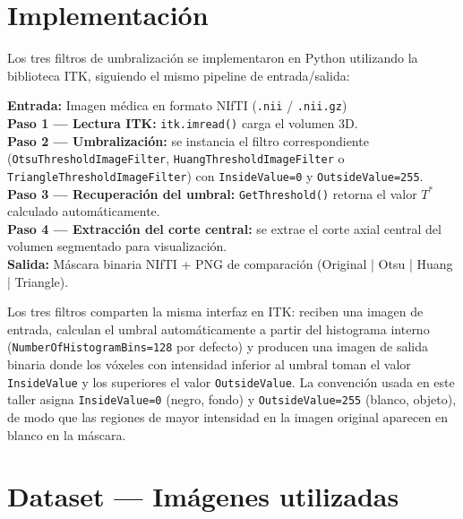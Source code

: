 \documentclass[12pt, a4paper]{article}
\begin{document}
\section{Implementación}

Los tres filtros de umbralización se implementaron en Python utilizando la biblioteca ITK,
siguiendo el mismo pipeline de entrada/salida:

\begin{tcolorbox}[infostyle, title={Pipeline de segmentación por umbralización (los tres métodos)}]
\textbf{Entrada:} Imagen médica en formato NIfTI (\texttt{.nii} / \texttt{.nii.gz})\\[0.3em]
\textbf{Paso 1 — Lectura ITK:} \texttt{itk.imread()} carga el volumen 3D.\\[0.3em]
\textbf{Paso 2 — Umbralización:} se instancia el filtro correspondiente
(\texttt{OtsuThresholdImageFilter}, \texttt{HuangThresholdImageFilter} o
\texttt{TriangleThresholdImageFilter}) con \texttt{InsideValue=0} y
\texttt{OutsideValue=255}.\\[0.3em]
\textbf{Paso 3 — Recuperación del umbral:} \texttt{GetThreshold()} retorna el valor $T^*$
calculado automáticamente.\\[0.3em]
\textbf{Paso 4 — Extracción del corte central:} se extrae el corte axial central del
volumen segmentado para visualización.\\[0.3em]
\textbf{Salida:} Máscara binaria NIfTI + PNG de comparación (Original | Otsu | Huang | Triangle).
\end{tcolorbox}

Los tres filtros comparten la misma interfaz en ITK: reciben una imagen de entrada, calculan
el umbral automáticamente a partir del histograma interno (\texttt{NumberOfHistogramBins=128}
por defecto) y producen una imagen de salida binaria donde los vóxeles con intensidad inferior
al umbral toman el valor \texttt{InsideValue} y los superiores el valor \texttt{OutsideValue}.
La convención usada en este taller asigna \texttt{InsideValue=0} (negro, fondo) y
\texttt{OutsideValue=255} (blanco, objeto), de modo que las regiones de mayor intensidad
en la imagen original aparecen en blanco en la máscara.

\section{Dataset — Imágenes utilizadas}
\end{document}
